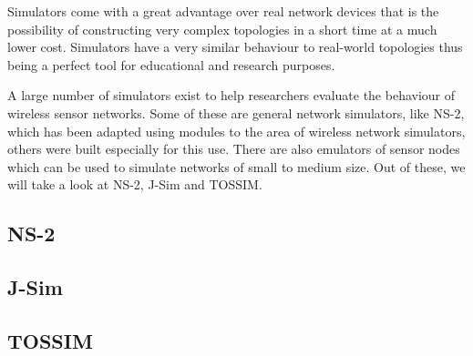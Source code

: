 
Simulators come with a great advantage over real network devices that is the 
possibility of constructing very complex topologies in a short time at a much lower 
cost. Simulators have a very similar behaviour to real-world topologies thus being 
a perfect tool for educational and research purposes. 

A large number of simulators exist to help researchers evaluate the behaviour of
wireless sensor networks. Some of these are general network simulators, like NS-2,
which has been adapted using modules to the area of wireless network simulators, others
were built especially for this use. There are also emulators of sensor nodes which can be
used to simulate networks of small to medium size. Out of these, we will take a look at NS-2, 
J-Sim and TOSSIM.

\subsection{NS-2}

\subsection{J-Sim}

\subsection{TOSSIM}

